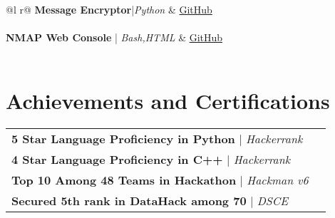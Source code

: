 \documentclass[a4paper,10pt]{article}
\begin{document}
\begin{tabularx}{\linewidth}{ @{}l r@{} }
\vspace{-5pt}
    \textbf{Message Encryptor}|\textit{Python} & \hfill \href{https://github.com/suvanbanerjee/SleepSense}{GitHub} \\
      \\

\vspace{-5pt}
    \textbf{NMAP Web Console} | \textit{Bash,HTML} & \hfill
    \href{https://github.com/suvanbanerjee/nmap-frontend-cgi}{GitHub}
    \\
      \\ 
\vspace{2pt} 
  \end{tabularx}




  \section{Achievements and Certifications}


    \begin{tabularx}{\linewidth}{ @{}l r@{} }
      \textbf{5 Star Language Proficiency in Python} | \textit{ Hackerrank} \\ [1.75pt] 
      \textbf{4 Star Language Proficiency in C++} | \textit{ Hackerrank} \\ [1.75pt]
      \textbf{Top 10 Among 48 Teams in Hackathon} | \textit{ Hackman v6} \\ [1.75pt]
      \textbf{Secured 5th rank in DataHack among 70} | \textit{DSCE} \\ [1.75pt]
    \end{tabularx}
\vspace{2pt} 
\end{document}
